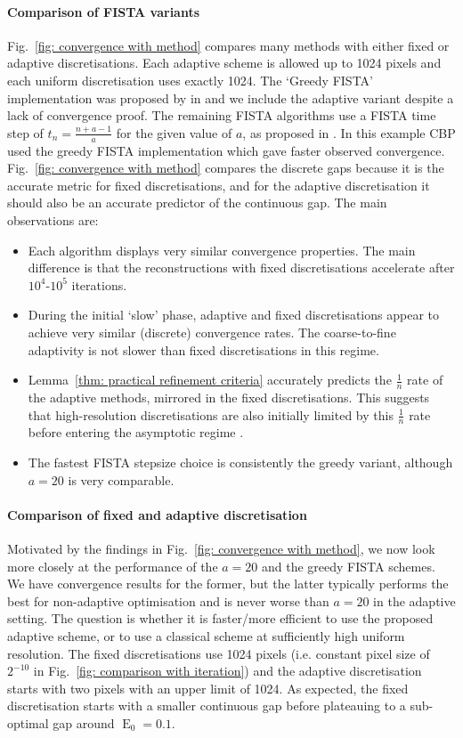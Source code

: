 \documentclass[smallextended]{svjour3}
\newcommand{\op}[1]{\operatorname{#1}}
\newcommand{\1}{\F{1}}
\newcommand{\edit}[3][1]{%
	\IfEq{#1}{2}{\def\mysecondvar{}}{\def\mysecondvar{#2}}%
	\ifx\mysecondvar\empty{}\else{%
		\IfEq{#1}{1}{%
			\ifmmode%
			\text{\color{red}\sout{\ensuremath{#2}}}%
			\else%
			{\color{red} \sout{#2}}%
			\fi%
		}{\color{red}#2}\ %
	}\fi{\color{darkgreen}#3}}
\begin{document}
	\paragraph{Comparison of FISTA variants}
	Fig.~\ref{fig: convergence with method} compares many methods with either fixed or adaptive discretisations. Each adaptive scheme is allowed up to 1024 pixels and each uniform discretisation uses exactly 1024. The `Greedy FISTA' implementation was proposed by in \cite{Liang2018} and we include the adaptive variant despite a lack of convergence proof. The remaining FISTA algorithms use a FISTA time step of $t_n = \frac{n+a-1}{a}$ for the given value of $a$, as proposed in \cite{Chambolle2015}. In this example CBP used the greedy FISTA implementation which gave faster observed convergence. Fig.~\ref{fig: convergence with method} compares the discrete gaps because it is the accurate metric for fixed discretisations, and for the adaptive discretisation it should also be an accurate predictor of the continuous gap. 
	The main observations are:
	\begin{itemize}
		\item Each algorithm displays very similar convergence properties. The main difference is that the reconstructions with fixed discretisations accelerate after $10^4$-$10^5$ iterations.
		\item During the initial `slow' phase, adaptive and fixed discretisations appear to achieve very similar (discrete) convergence rates. The coarse-to-fine adaptivity is not slower than fixed discretisations in this regime.
		\item Lemma~\ref{thm: practical refinement criteria} accurately predicts the $\frac1n$ rate of the adaptive methods, mirrored in the fixed discretisations. This suggests that high-resolution discretisations are also initially limited by this $\frac1n$ rate before entering the asymptotic regime\edit{}{, consistent with \eqref{eq: slow exact FISTA}}.
		\item The fastest FISTA stepsize choice is consistently the greedy variant, although $a=20$ is very comparable.
	\end{itemize}
	
	\paragraph{Comparison of fixed and adaptive discretisation}
	Motivated by the findings in Fig.~\ref{fig: convergence with method}, we now look more closely at the performance of the $a=20$ and the greedy FISTA schemes. We have convergence results for the former, but the latter typically performs the best for non-adaptive optimisation and is never worse than $a=20$ in the adaptive setting. The question is whether it is faster/more efficient to use the proposed adaptive scheme, or to use a classical scheme at sufficiently high uniform resolution. The fixed discretisations use 1024 pixels (i.e. constant pixel size of $2^{-10}$ in Fig.~\ref{fig: comparison with iteration}) and the adaptive discretisation starts with two pixels with an upper limit of 1024. As expected, the fixed discretisation starts with a smaller continuous gap before plateauing to a sub-optimal gap around $\op{E}_0=0.1$.
	
\end{document}
